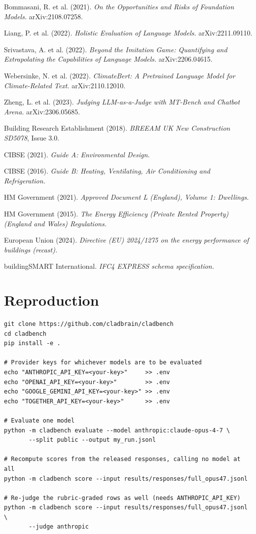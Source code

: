 \documentclass[11pt,a4paper]{article}
\begin{document}
Bommasani, R. et al. (2021). \emph{On the Opportunities and Risks of Foundation Models.} arXiv:2108.07258.

Liang, P. et al. (2022). \emph{Holistic Evaluation of Language Models.} arXiv:2211.09110.

Srivastava, A. et al. (2022). \emph{Beyond the Imitation Game: Quantifying and Extrapolating the Capabilities of Language Models.} arXiv:2206.04615.

Webersinke, N. et al. (2022). \emph{ClimateBert: A Pretrained Language Model for Climate-Related Text.} arXiv:2110.12010.

Zheng, L. et al. (2023). \emph{Judging LLM-as-a-Judge with MT-Bench and Chatbot Arena.} arXiv:2306.05685.

Building Research Establishment (2018). \emph{BREEAM UK New Construction SD5078}, Issue 3.0.

CIBSE (2021). \emph{Guide A: Environmental Design.}

CIBSE (2016). \emph{Guide B: Heating, Ventilating, Air Conditioning and Refrigeration.}

HM Government (2021). \emph{Approved Document L (England), Volume 1: Dwellings.}

HM Government (2015). \emph{The Energy Efficiency (Private Rented Property) (England and Wales) Regulations.}

European Union (2024). \emph{Directive (EU) 2024/1275 on the energy performance of buildings (recast).}

buildingSMART International. \emph{IFC4 EXPRESS schema specification.}


\appendix
\section{Reproduction}

\begin{verbatim}
git clone https://github.com/cladbrain/cladbench
cd cladbench
pip install -e .

# Provider keys for whichever models are to be evaluated
echo "ANTHROPIC_API_KEY=<your-key>"     >> .env
echo "OPENAI_API_KEY=<your-key>"        >> .env
echo "GOOGLE_GEMINI_API_KEY=<your-key>" >> .env
echo "TOGETHER_API_KEY=<your-key>"      >> .env

# Evaluate one model
python -m cladbench evaluate --model anthropic:claude-opus-4-7 \
       --split public --output my_run.jsonl

# Recompute scores from the released responses, calling no model at all
python -m cladbench score --input results/responses/full_opus47.jsonl

# Re-judge the rubric-graded rows as well (needs ANTHROPIC_API_KEY)
python -m cladbench score --input results/responses/full_opus47.jsonl \
       --judge anthropic
\end{verbatim}
\end{document}
